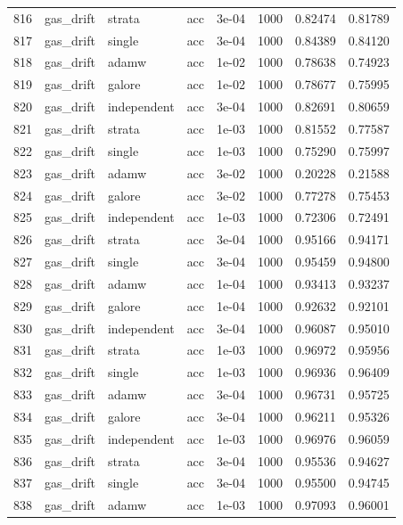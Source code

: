 \begin{longtable}{rlllrrrr}
\rowcolor{oursbg}
816 & gas\_drift & strata & acc & 3e-04 & 1000 & 0.82474 & 0.81789 \\
817 & gas\_drift & single & acc & 3e-04 & 1000 & 0.84389 & 0.84120 \\
818 & gas\_drift & adamw & acc & 1e-02 & 1000 & 0.78638 & 0.74923 \\
819 & gas\_drift & galore & acc & 1e-02 & 1000 & 0.78677 & 0.75995 \\
820 & gas\_drift & independent & acc & 3e-04 & 1000 & 0.82691 & 0.80659 \\
\rowcolor{oursbg}
821 & gas\_drift & strata & acc & 1e-03 & 1000 & 0.81552 & 0.77587 \\
822 & gas\_drift & single & acc & 1e-03 & 1000 & 0.75290 & 0.75997 \\
823 & gas\_drift & adamw & acc & 3e-02 & 1000 & 0.20228 & 0.21588 \\
824 & gas\_drift & galore & acc & 3e-02 & 1000 & 0.77278 & 0.75453 \\
825 & gas\_drift & independent & acc & 1e-03 & 1000 & 0.72306 & 0.72491 \\
\rowcolor{oursbg}
826 & gas\_drift & strata & acc & 3e-04 & 1000 & 0.95166 & 0.94171 \\
827 & gas\_drift & single & acc & 3e-04 & 1000 & 0.95459 & 0.94800 \\
828 & gas\_drift & adamw & acc & 1e-04 & 1000 & 0.93413 & 0.93237 \\
829 & gas\_drift & galore & acc & 1e-04 & 1000 & 0.92632 & 0.92101 \\
830 & gas\_drift & independent & acc & 3e-04 & 1000 & 0.96087 & 0.95010 \\
\rowcolor{oursbg}
831 & gas\_drift & strata & acc & 1e-03 & 1000 & 0.96972 & 0.95956 \\
832 & gas\_drift & single & acc & 1e-03 & 1000 & 0.96936 & 0.96409 \\
833 & gas\_drift & adamw & acc & 3e-04 & 1000 & 0.96731 & 0.95725 \\
834 & gas\_drift & galore & acc & 3e-04 & 1000 & 0.96211 & 0.95326 \\
835 & gas\_drift & independent & acc & 1e-03 & 1000 & 0.96976 & 0.96059 \\
\rowcolor{oursbg}
836 & gas\_drift & strata & acc & 3e-04 & 1000 & 0.95536 & 0.94627 \\
837 & gas\_drift & single & acc & 3e-04 & 1000 & 0.95500 & 0.94745 \\
838 & gas\_drift & adamw & acc & 1e-03 & 1000 & 0.97093 & 0.96001 \\

\end{longtable}
